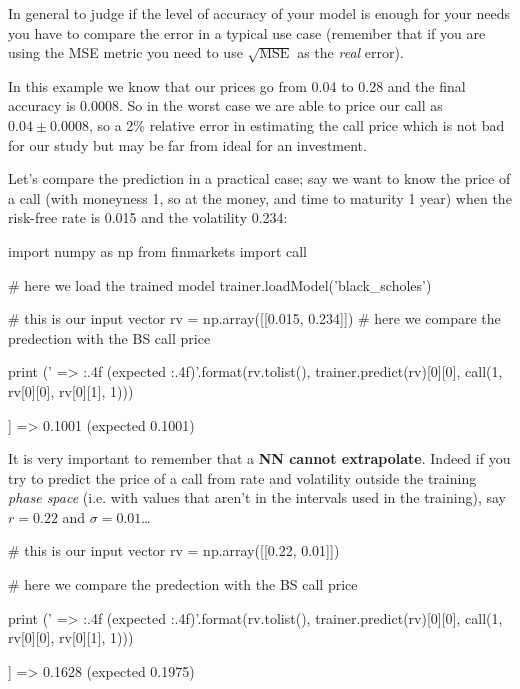 In general to judge if the level of accuracy of your model is enough for your needs you have to compare the error in a typical use case (remember that if you are using the MSE metric you need to use \(\sqrt{\mathrm{MSE}}\) as the \emph{real} error).

In this example we know that our prices go from 0.04 to 0.28 and the final accuracy is 0.0008. So in the worst case we are able to price our call as \(0.04 \pm 0.0008\), so a 2\% relative error in estimating the call price which is not bad for our study but may be far from ideal for an investment.

Let's compare the prediction in a practical case; say we want to know the price of a call (with moneyness 1, so at the money, and time to maturity 1 year) when the risk-free rate is 0.015 and the volatility 0.234:

\begin{ipython}
import numpy as np
from finmarkets import call

# here we load the trained model
trainer.loadModel('black_scholes')

# this is our input vector
rv = np.array([[0.015, 0.234]])
# here we compare the predection with the BS call price

print ('{} => {:.4f} (expected {:.4f})'.format(rv.tolist(),
                                               trainer.predict(rv)[0][0],
                                               call(1, rv[0][0], rv[0][1], 1)))
\end{ipython}
\begin{ioutput}
[[0.015, 0.234]] => 0.1001 (expected 0.1001)
\end{ioutput}

It is very important to remember that a \textbf{NN cannot extrapolate}.
Indeed if you try to predict the price of a call from rate and volatility outside the training \emph{phase space} (i.e. with values that aren't in the intervals used in the training), say \(r = 0.22\) and \(\sigma = 0.01\)\ldots{}

\begin{ipython}
# this is our input vector
rv = np.array([[0.22, 0.01]])

# here we compare the predection with the BS call price

print ('{} => {:.4f} (expected {:.4f})'.format(rv.tolist(),
                                        trainer.predict(rv)[0][0],
                                        call(1, rv[0][0], rv[0][1], 1)))
\end{ipython}
\begin{ioutput}
[[0.22, 0.01]] => 0.1628 (expected 0.1975)
\end{ioutput}

